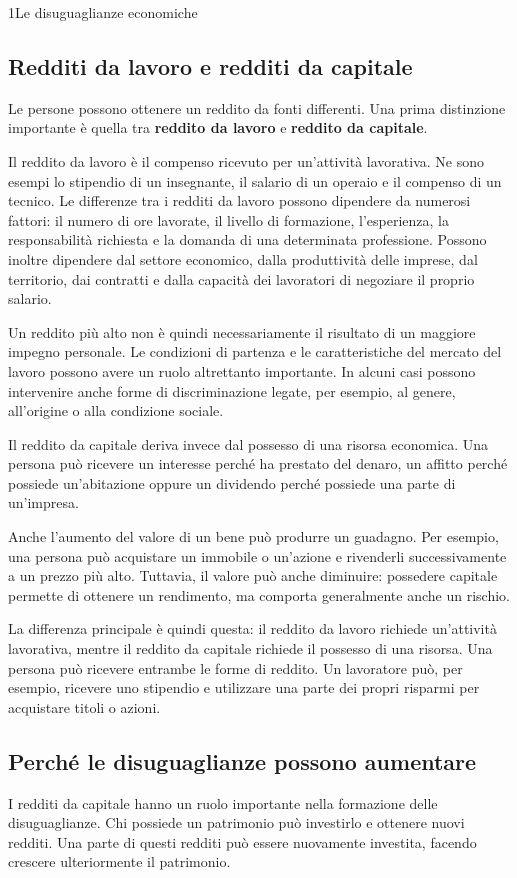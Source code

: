 \begin{lettura}{1}{Le disuguaglianze economiche}
\subsection*{Redditi da lavoro e redditi da capitale}
Le persone possono ottenere un reddito da fonti differenti. Una prima distinzione importante è quella tra \textbf{reddito da lavoro} e \textbf{reddito da capitale}.

Il reddito da lavoro è il compenso ricevuto per un'attività lavorativa. Ne sono esempi lo stipendio di un insegnante, il salario di un operaio e il compenso di un tecnico. Le differenze tra i redditi da lavoro possono dipendere da numerosi fattori: il numero di ore lavorate, il livello di formazione, l'esperienza, la responsabilità richiesta e la domanda di una determinata professione. Possono inoltre dipendere dal settore economico, dalla produttività delle imprese, dal territorio, dai contratti e dalla capacità dei lavoratori di negoziare il proprio salario.

Un reddito più alto non è quindi necessariamente il risultato di un maggiore impegno personale. Le condizioni di partenza e le caratteristiche del mercato del lavoro possono avere un ruolo altrettanto importante. In alcuni casi possono intervenire anche forme di discriminazione legate, per esempio, al genere, all'origine o alla condizione sociale.

Il reddito da capitale deriva invece dal possesso di una risorsa economica. Una persona può ricevere un interesse perché ha prestato del denaro, un affitto perché possiede un'abitazione oppure un dividendo perché possiede una parte di un'impresa.

Anche l'aumento del valore di un bene può produrre un guadagno. Per esempio, una persona può acquistare un immobile o un'azione e rivenderli successivamente a un prezzo più alto. Tuttavia, il valore può anche diminuire: possedere capitale permette di ottenere un rendimento, ma comporta generalmente anche un rischio.

La differenza principale è quindi questa: il reddito da lavoro richiede un'attività lavorativa, mentre il reddito da capitale richiede il possesso di una risorsa. Una persona può ricevere entrambe le forme di reddito. Un lavoratore può, per esempio, ricevere uno stipendio e utilizzare una parte dei propri risparmi per acquistare titoli o azioni.

\subsection*{Perché le disuguaglianze possono aumentare}
I redditi da capitale hanno un ruolo importante nella formazione delle disuguaglianze. Chi possiede un patrimonio può investirlo e ottenere nuovi redditi. Una parte di questi redditi può essere nuovamente investita, facendo crescere ulteriormente il patrimonio.


\end{lettura}
